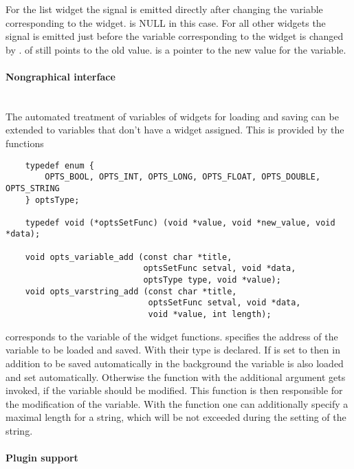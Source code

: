 For the list widget the signal  is emitted
directly after changing the variable corresponding to the
widget.  is NULL in this case. For all other widgets
the signal  is emitted just before the
variable corresponding to the widget is changed by
\icewing{}.  of  still points to the old
value.  is a pointer to the new value for the
variable.

\paragraph{Nongraphical interface}\hfill\\

The automated treatment of variables of widgets for loading and
saving can be extended to variables that don't have a widget
assigned. This is provided by the functions
\begin{small}
\linespread{0.9}
\begin{verbatim}
    typedef enum {
        OPTS_BOOL, OPTS_INT, OPTS_LONG, OPTS_FLOAT, OPTS_DOUBLE, OPTS_STRING
    } optsType;

    typedef void (*optsSetFunc) (void *value, void *new_value, void *data);

    void opts_variable_add (const char *title,
                            optsSetFunc setval, void *data,
                            optsType type, void *value);
    void opts_varstring_add (const char *title,
                             optsSetFunc setval, void *data,
                             void *value, int length);
\end{verbatim}
\end{small}
 corresponds to the  variable of the widget
functions.  specifies the address of the variable to be
loaded and saved. With  their type is declared. If
 is set to  then in addition to be saved
automatically in the background the variable is also loaded and set
automatically. Otherwise the function  with the
additional argument  gets invoked, if the variable should
be modified. This function is then responsible for the modification
of the variable. With the function  one
can additionally specify a maximal length for a string, which will
be not exceeded during the setting of the string.

\paragraph{Plugin support}\label{para:pluginSupport}\hfill\\

